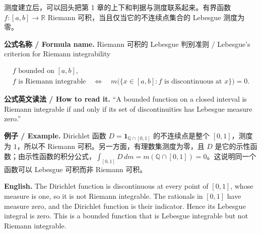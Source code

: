 \documentclass[UTF8,11pt,a4paper]{ctexart}
\newcommand{\EN}[1]{\par\noindent\textbf{English.} #1\par}
\newcommand{\READ}[1]{\par\noindent\textbf{公式英文读法 / How to read it.} #1\par}
\newcommand{\FORMULA}[2]{\par\Needspace{3\baselineskip}\noindent\textbf{公式名称 / Formula name.} #1 / #2\par}
\newcommand{\EX}[2]{\par\noindent\textbf{例子 / Example.} #1\par\EN{#2}}
\begin{document}
\noindent 测度建立后，可以回头把第 1 章的上下和判据与测度联系起来。有界函数 $f:[a,b]\to\mathbb R$ Riemann 可积，当且仅当它的不连续点集合的 Lebesgue 测度为零。
\FORMULA{Riemann 可积的 Lebesgue 判别准则}{Lebesgue's criterion for Riemann integrability}
\[
\begin{gathered}
f\text{ bounded on }[a,b],\\
f\text{ is Riemann integrable}
\quad\Longleftrightarrow\quad
m\bigl(\{x\in[a,b]:f\text{ is discontinuous at }x\}\bigr)=0.
\end{gathered}
\]
\READ{“A bounded function on a closed interval is Riemann integrable if and only if its set of discontinuities has Lebesgue measure zero.”}
\EX{Dirichlet 函数 $D=\mathbf1_{\mathbb Q\cap[0,1]}$ 的不连续点是整个 $[0,1]$，测度为 $1$，所以不 Riemann 可积。另一方面，有理数集测度为零，且 $D$ 是它的示性函数；由示性函数的积分公式，$\int_{[0,1]}D\,dm=m(\mathbb Q\cap[0,1])=0$。这说明同一个函数可以 Lebesgue 可积而非 Riemann 可积。}{The Dirichlet function is discontinuous at every point of $[0,1]$, whose measure is one, so it is not Riemann integrable. The rationals in $[0,1]$ have measure zero, and the Dirichlet function is their indicator. Hence its Lebesgue integral is zero. This is a bounded function that is Lebesgue integrable but not Riemann integrable.}
\end{document}
